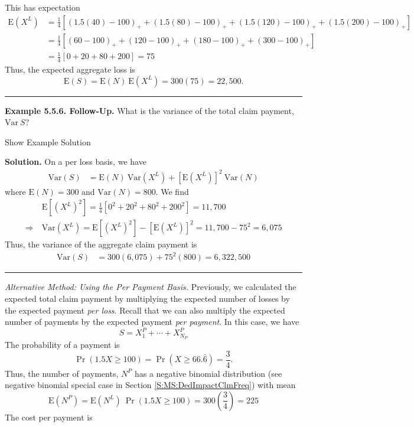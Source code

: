 \documentclass[]{book}
\theoremstyle{definition}
\theoremstyle{definition}
\theoremstyle{definition}
\theoremstyle{remark}
\begin{document}
This has expectation \[\begin{aligned}
\mathrm{E}(X^L) &= \frac{1}{4} \left[ \left(1.5(40)-100\right)_+ +
\left(1.5(80)-100\right)_+ + \left(1.5(120)-100\right)_+ +
\left(1.5(200)-100\right)_+ \right]  \\
&= \frac{1}{4}\left[ (60-100)_+ + (120-100)_+ + (180-100)_+ + (300-100)_+\right] \\
&= \frac{1}{4}\left[ 0 + 20 + 80 + 200 \right] = 75
\end{aligned}\] Thus, the expected aggregate loss is
\[\mathrm{E}(S)=\mathrm{E}(N) ~ \mathrm{E} \left(X^L \right)= 300 (75) = 22,500
.\]

\begin{center}\rule{0.5\linewidth}{\linethickness}\end{center}

\textbf{Example 5.5.6. Follow-Up.} What is the variance of the total
claim payment, \(\mathrm{Var~}S\)?

Show Example Solution

\hypertarget{toggleExampleAggLoss.5.6}{}
\textbf{Solution.} On a per loss basis, we have \[\begin{aligned}
\mathrm{Var}(S) &= \mathrm{E}(N) ~ \mathrm{Var}\left(  X^L \right) + \left[ \mathrm{E} \left(X^L\right) \right]^2 ~ \mathrm{Var} (N)
\end{aligned}\] where \(\mathrm{E}(N) = 300\) and
\(\mathrm{Var}(N) = 800\). We find \[\begin{aligned}
&\mathrm{E} \left[ (X^L)^2 \right] = \frac{1}{4} \left[ 0^2 + 20^2 + 80^2 + 200^2 \right] = 11,700 \\
\Rightarrow \ & \mathrm{Var}(X^L) = \mathrm{E} \left[ (X^L)^2 \right] - \left[ \mathrm{E}(X^L) \right]^2 = 11,700 - 75^2 = 6,075
\end{aligned}\] Thus, the variance of the aggregate claim payment is
\[\begin{aligned}
\mathrm{Var}(S) &= 300(6,075) + 75^2 (800) = 6,322,500
\end{aligned}\]

\begin{center}\rule{0.5\linewidth}{\linethickness}\end{center}

\emph{Alternative Method: Using the Per Payment Basis.} Previously, we
calculated the expected total claim payment by multiplying the expected
number of losses by the expected payment \emph{per loss}. Recall that we
can also multiply the expected number of payments by the expected
payment \emph{per payment}. In this case, we have
\[S=X_1^P + \cdots + X_{N_P}^P \] The probability of a payment is
\[\Pr(1.5X \ge 100)=\Pr(X \ge 66.\bar{6})=\frac{3}{4} .\] Thus, the
number of payments, \(N^P\) has a negative binomial distribution (see
negative binomial special case in Section \ref{S:MS:DedImpactClmFreq})
with mean
\[\mathrm{E}(N^P) =  \mathrm{E}(N^L)~\Pr(1.5X \geq 100) = 300 \left(\frac{3}{4} \right)=225\]
The cost per payment is
\end{document}

